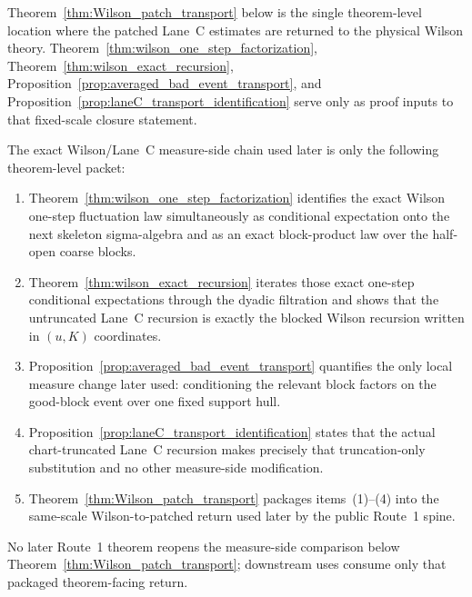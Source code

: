 \begin{remark}\label{rem:transport_status}
Theorem~\ref{thm:Wilson_patch_transport} below is the single theorem-level location where the patched Lane~C estimates are returned to the physical Wilson theory.
Theorem~\ref{thm:wilson_one_step_factorization}, Theorem~\ref{thm:wilson_exact_recursion}, Proposition~\ref{prop:averaged_bad_event_transport}, and Proposition~\ref{prop:laneC_transport_identification} serve only as proof inputs to that fixed-scale closure statement.
\end{remark}

\begin{remark}\label{rem:route1_measure_pipeline}
The exact Wilson/Lane~C measure-side chain used later is only the following theorem-level packet:
\begin{enumerate}[label=\textup{(\arabic*)},leftmargin=2.35em]
\item Theorem~\ref{thm:wilson_one_step_factorization} identifies the exact Wilson one-step fluctuation law simultaneously as conditional expectation onto the next skeleton sigma-algebra and as an exact block-product law over the half-open coarse blocks.
\item Theorem~\ref{thm:wilson_exact_recursion} iterates those exact one-step conditional expectations through the dyadic filtration and shows that the untruncated Lane~C recursion is exactly the blocked Wilson recursion written in $(u,K)$ coordinates.
\item Proposition~\ref{prop:averaged_bad_event_transport} quantifies the only local measure change later used: conditioning the relevant block factors on the good-block event over one fixed support hull.
\item Proposition~\ref{prop:laneC_transport_identification} states that the actual chart-truncated Lane~C recursion makes precisely that truncation-only substitution and no other measure-side modification.
\item Theorem~\ref{thm:Wilson_patch_transport} packages items~\textup{(1)}--\textup{(4)} into the same-scale Wilson-to-patched return used later by the public Route~1 spine.
\end{enumerate}
No later Route~1 theorem reopens the measure-side comparison below Theorem~\ref{thm:Wilson_patch_transport}; downstream uses consume only that packaged theorem-facing return.
\end{remark}

